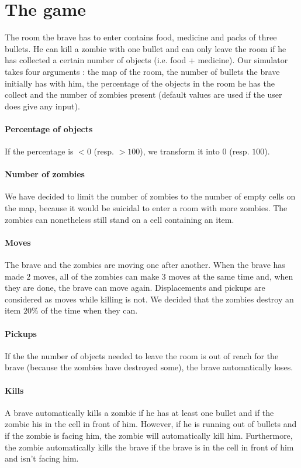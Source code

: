 \documentclass[11pt,a4paper]{article}
\begin{document}
\section*{The game}

The room the brave has to enter contains food, medicine and packs of three bullets. He can kill a zombie with one bullet and can only leave the room if he has collected a certain number of objects (i.e. food + medicine). Our simulator takes four arguments : the map of the room, the number of bullets the brave initially has with him, the percentage of the objects in the room he has the collect and the number of zombies present (default values are used if the user does give any input).

\paragraph{Percentage of objects} If the percentage is $< 0$ (resp. $ > 100$), we transform it into $0$ (resp. $100$).

\paragraph{Number of zombies} We have decided to limit the number of zombies to the number of empty cells on the map, because it would be suicidal to enter a room with more zombies. The zombies can nonetheless still stand on a cell containing an item. 

\paragraph{Moves} The brave and the zombies are moving one after another. When the brave has made $2$ moves, all of the zombies can make $3$ moves at the same time and, when they are done, the brave can move again. Displacements and pickups are considered as moves while killing is not. We decided that the zombies destroy an item $20\%$ of the time when they can. 

\paragraph{Pickups} If the the number of objects needed to leave the room is out of reach for the brave (because the zombies have destroyed some), the brave automatically loses. 

\paragraph{Kills} A brave automatically kills a zombie if he has at least one bullet and if the zombie his in the cell in front of him. However, if he is running out of bullets and if the zombie is facing him, the zombie will automatically kill him. Furthermore, the zombie automatically kills the brave if the brave is in the cell in front of him and isn't facing him.
\end{document}
